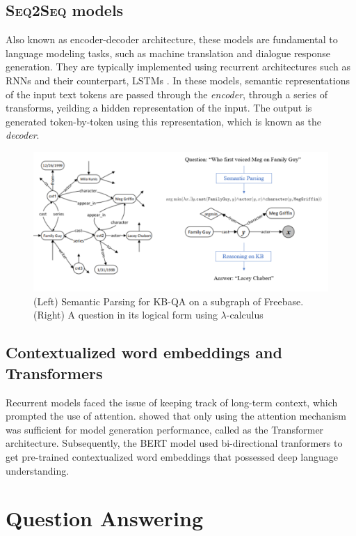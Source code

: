 \documentclass[11pt,a4paper]{article}
\begin{document}
\subsection{\textsc{Seq2Seq} models}

Also known as encoder-decoder architecture, these models are fundamental to language modeling tasks, such as machine translation and dialogue response generation. They are typically implemented using recurrent architectures such as RNNs and their counterpart, LSTMs \cite{Hochreiter1997LongSM}. In these models, semantic representations of the input text tokens are passed through the \textit{encoder}, through a series of transforms, yeilding a hidden representation of the input. The output is generated token-by-token using this representation, which is known as the \textit{decoder}. 

\begin{figure}[t]
  \centering
  \includegraphics[width=\textwidth]{images/kg.png}
  \caption{(Left) Semantic Parsing for KB-QA on a subgraph of Freebase. (Right) A question in its logical form using $\lambda$-calculus}
\end{figure}

\subsection{Contextualized word embeddings and Transformers}

Recurrent models faced the issue of keeping track of long-term context, which prompted the use of attention. \cite{Vaswani2017AttentionIA} showed that only using the attention mechanism was sufficient for model generation performance, called as the Transformer architecture. Subsequently, the BERT model \cite{Devlin2019BERTPO} used bi-directional tranformers to get pre-trained contextualized word embeddings that possessed deep language understanding.

\section{Question Answering}
\end{document}
